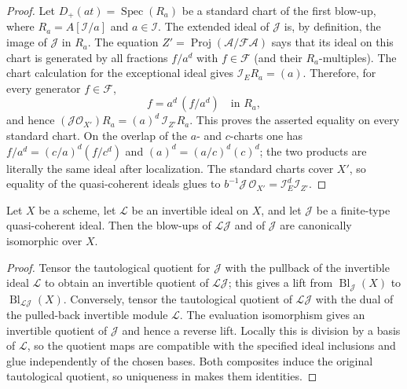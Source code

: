 \begin{proof}
  Let $D_+(at)=\operatorname{Spec}(R_a)$ be a standard chart of the first
  blow-up, where $R_a=A[\mathcal I/a]$ and $a\in\mathcal I$.  The extended
  ideal of $\mathcal J$ is, by definition, the image of $\mathcal J$ in
  $R_a$.  The equation
  $Z'=\operatorname{Proj}(\mathcal A/\mathcal F\mathcal A)$ says that its
  ideal on this chart is generated by all fractions $f/a^d$ with
  $f\in\mathcal F$ (and their $R_a$-multiples).  The chart calculation for
  the exceptional ideal gives $\mathcal I_E R_a=(a)$.  Therefore, for every
  generator $f\in\mathcal F$,
  \[
    f=a^d\,(f/a^d)\quad\text{in }R_a,
  \]
  and hence
  $(\mathcal J\mathcal O_{X'})R_a=(a)^d\,\mathcal I_{Z'}R_a$.
  This proves the asserted equality on every standard chart.  On the overlap
  of the $a$- and $c$-charts one has
  $f/a^d=(c/a)^d(f/c^d)$ and $(a)^d=(a/c)^d(c)^d$; the two products are
  literally the same ideal after localization.  The standard charts cover
  $X'$, so equality of the quasi-coherent ideals glues to
  $b^{-1}\mathcal J\,\mathcal O_{X'}=\mathcal I_E^d\mathcal I_{Z'}$.
\end{proof}

\begin{lemma}
  \label{lemma:nagata-blowup-invertible-factor}

  Let $X$ be a scheme, let $\mathcal L$ be an invertible ideal on $X$, and
  let $\mathcal J$ be a finite-type quasi-coherent ideal.  Then the blow-ups
  of $\mathcal L\mathcal J$ and of $\mathcal J$ are canonically isomorphic
  over $X$.
\end{lemma}

\begin{proof}
  Tensor the tautological quotient for $\mathcal J$ with the pullback of the
  invertible ideal $\mathcal L$ to obtain an invertible quotient of
  $\mathcal L\mathcal J$; this gives a lift from
  $\operatorname{Bl}_{\mathcal J}(X)$ to
  $\operatorname{Bl}_{\mathcal L\mathcal J}(X)$.  Conversely, tensor the
  tautological quotient of $\mathcal L\mathcal J$ with the dual of the
  pulled-back invertible module $\mathcal L$.  The evaluation isomorphism
  gives an invertible quotient of $\mathcal J$ and hence a reverse lift.
  Locally this is division by a basis of $\mathcal L$, so the quotient maps
  are compatible with the specified ideal inclusions and glue independently
  of the chosen bases.  Both composites induce the original tautological
  quotient, so uniqueness in
   makes them identities.
\end{proof}

